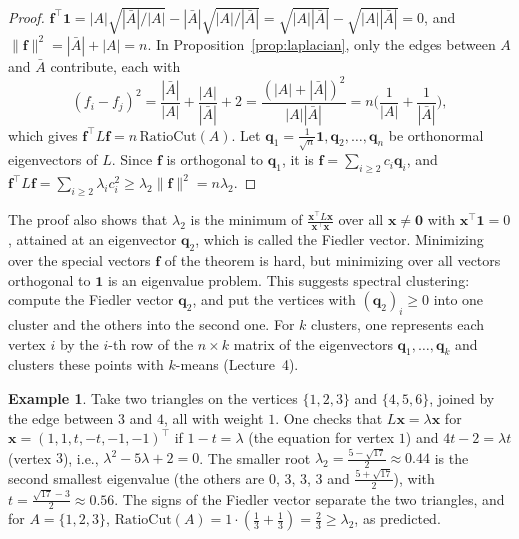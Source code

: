 \documentclass[11pt]{article}
\newcommand{\norm}[1]{\lVert #1 \rVert}
\theoremstyle{definition}
\newtheorem{example}[definition]{Example}
\theoremstyle{plain}
\theoremstyle{remark}
\begin{document}
\begin{proof}
    $\mathbf{f}^\top\mathbf{1} = |A|\sqrt{|\bar{A}|/|A|} - |\bar{A}|\sqrt{|A|/|\bar{A}|} = \sqrt{|A||\bar{A}|} - \sqrt{|A||\bar{A}|} = 0$, and $\norm{\mathbf{f}}^2 = |\bar{A}| + |A| = n$. In Proposition~\ref{prop:laplacian}, only the edges between $A$ and $\bar{A}$ contribute, each with
    \[(f_i - f_j)^2 = \frac{|\bar{A}|}{|A|} + \frac{|A|}{|\bar{A}|} + 2 = \frac{(|A| + |\bar{A}|)^2}{|A||\bar{A}|} = n\Big(\frac{1}{|A|} + \frac{1}{|\bar{A}|}\Big),\]
    which gives $\mathbf{f}^\top L\mathbf{f} = n\,\mathrm{RatioCut}(A)$. Let $\mathbf{q}_1 = \frac{1}{\sqrt{n}}\mathbf{1}, \mathbf{q}_2, \ldots, \mathbf{q}_n$ be orthonormal eigenvectors of $L$. Since $\mathbf{f}$ is orthogonal to $\mathbf{q}_1$, it is $\mathbf{f} = \sum_{i \geq 2} c_i\mathbf{q}_i$, and $\mathbf{f}^\top L\mathbf{f} = \sum_{i \geq 2} \lambda_ic_i^2 \geq \lambda_2\norm{\mathbf{f}}^2 = n\lambda_2$.
\end{proof}

The proof also shows that $\lambda_2$ is the minimum of $\frac{\mathbf{x}^\top L\mathbf{x}}{\mathbf{x}^\top \mathbf{x}}$ over all $\mathbf{x} \neq \mathbf{0}$ with $\mathbf{x}^\top\mathbf{1} = 0$, attained at an eigenvector $\mathbf{q}_2$, which is called the Fiedler vector. Minimizing over the special vectors $\mathbf{f}$ of the theorem is hard, but minimizing over all vectors orthogonal to $\mathbf{1}$ is an eigenvalue problem. This suggests spectral clustering: compute the Fiedler vector $\mathbf{q}_2$, and put the vertices with $(\mathbf{q}_2)_i \geq 0$ into one cluster and the others into the second one. For $k$ clusters, one represents each vertex $i$ by the $i$-th row of the $n \times k$ matrix of the eigenvectors $\mathbf{q}_1, \ldots, \mathbf{q}_k$ and clusters these points with $k$-means (Lecture~4).

\begin{example}\label{ex:two-triangles}
    Take two triangles on the vertices $\{1, 2, 3\}$ and $\{4, 5, 6\}$, joined by the edge between $3$ and $4$, all with weight $1$. One checks that $L\mathbf{x} = \lambda \mathbf{x}$ for $\mathbf{x} = (1, 1, t, -t, -1, -1)^\top$ if $1 - t = \lambda$ (the equation for vertex $1$) and $4t - 2 = \lambda t$ (vertex $3$), i.e., $\lambda^2 - 5\lambda + 2 = 0$. The smaller root $\lambda_2 = \frac{5 - \sqrt{17}}{2} \approx 0.44$ is the second smallest eigenvalue (the others are $0$, $3$, $3$, $3$ and $\frac{5 + \sqrt{17}}{2}$), with $t = \frac{\sqrt{17} - 3}{2} \approx 0.56$. The signs of the Fiedler vector separate the two triangles, and for $A = \{1, 2, 3\}$, $\mathrm{RatioCut}(A) = 1 \cdot (\frac{1}{3} + \frac{1}{3}) = \frac{2}{3} \geq \lambda_2$, as predicted.
\end{example}
\end{document}
